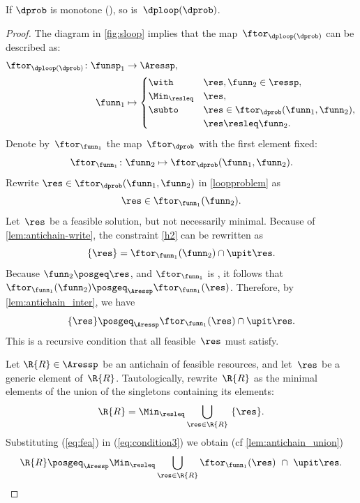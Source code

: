 \begin{proposition}
\label{pro:loop-continuous}If $\dprob$ is monotone (),
so is~$\dploop(\dprob)$.
\end{proposition}
\begin{proof}
The diagram in \cref{fig:sloop} implies that the map~$\ftor_{\dploop(\dprob)}$
can be described as:
\begin{align}
\ftor_{\dploop(\dprob)}\colon\funsp_{1} & \rightarrow\Aressp,\label{eq:loopproblem}\\
\funn_{1} & \mapsto\begin{cases}
\with & \res,\funn_{2}\in\ressp,\\
\Min_{\resleq} & \res,\\
\subto & \res\in\ftor_{\dprob}(\funn_{1},\funn_{2}),\\
 & \res\resleq\funn_{2}.
\end{cases}
\end{align}
Denote by~$\ftor_{\funn_{1}}$ the map~$\ftor_{\dprob}$ with the
first element fixed:
\[
\ftor_{\funn_{1}}\colon\funn_{2}\mapsto\ftor_{\dprob}(\funn_{1},\funn_{2}).
\]
Rewrite $\res\in\ftor_{\dprob}(\funn_{1},\funn_{2})$ in \eqref{loopproblem}
as
\begin{equation}
\res\in\ftor_{\funn_{1}}(\funn_{2}).\label{eq:h2}
\end{equation}
Let~$\res$ be a feasible solution, but not necessarily minimal.
Because of \cref{lem:antichain-write}, the constraint \eqref{h2} can
be rewritten as
\begin{equation}
\{\res\}=\ftor_{\funn_{1}}(\funn_{2})\cap\upit\res.\label{eq:h3}
\end{equation}
Because $\funn_{2}\posgeq\res$, and $\ftor_{\funn_{1}}$ is \scottcontinuous,
it follows that~$\ftor_{\funn_{1}}(\funn_{2})\posgeq_{\Aressp}\ftor_{\funn_{1}}(\res)$.
Therefore, by \cref{lem:antichain_inter}, we have
\begin{equation}
\{\res\}\posgeq_{\Aressp}\ftor_{\funn_{1}}(\res)\cap\upit\res.\label{eq:fea}
\end{equation}
This is a recursive condition that all feasible~$\res$ must satisfy.

Let $\R{R}\in\Aressp$ be an antichain of feasible resources, and
let~$\res$ be a generic element of~$\R{R}$. Tautologically, rewrite~$\R{R}$
as the minimal elements of the union of the singletons containing
its elements:
\begin{equation}
\R{R}=\Min_{\resleq}\bigcup_{\res\in\R{R}}\ \{\res\}.\label{eq:condition3}
\end{equation}
Substituting (\ref{eq:fea}) in (\ref{eq:condition3}) we obtain (cf
\cref{lem:antichain_union})
\begin{equation}
\R{R}\posgeq_{\Aressp}\Min_{\resleq}\bigcup_{\res\in\R{R}}\ftor_{\funn_{1}}(\res)\ \cap\ \upit\res.\label{eq:recursive}
\end{equation}


\end{proof}
